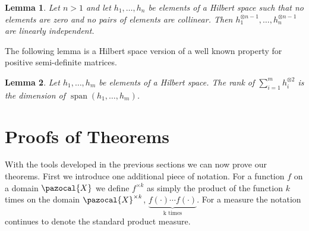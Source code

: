 \documentclass[aos]{imsart}
\def\sX{\pazocal{X}}
\def\span{\operatorname{span}}
\def\span{\operatorname{span}}
\theoremstyle{plain}
\newtheorem{lem}{Lemma}[section]
\theoremstyle{defintion}
\begin{document}
	\begin{lem}\label{lem:linind}
		Let $n>1$ and let $h_1,\ldots, h_n$ be elements of a Hilbert space such that no elements are zero and no pairs of elements are collinear. Then $h_1^{\otimes n-1},\ldots, h_n^{\otimes n-1}$ are linearly independent.
	\end{lem}
	The following lemma is a Hilbert space version of a well known property for positive semi-definite matrices.
	\begin{lem} \label{lem:tensrank}
		Let $h_1,\ldots,h_m$ be elements of a Hilbert space. The rank of $\sum_{i=1}^m h_i^{\otimes 2}$ is the dimension of $\span\left( h_1,\ldots,h_m \right)$.
	\end{lem}

	\section{Proofs of Theorems}
	With the tools developed in the previous sections we can now prove our theorems. First we introduce one additional piece of notation. For a function $f$ on a domain $\sX$ we define $f^{\times k}$ as simply the product of the function $k$ times on the domain $\sX^{\times k}$, $\underbrace{f(\cdot)\cdots f(\cdot)}_{\text{k times}}$. For a measure the notation continues to denote the standard product measure.
\end{document}
